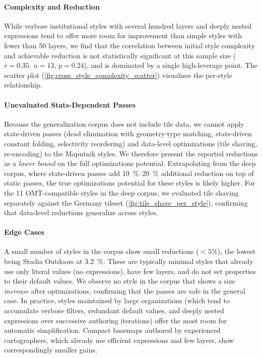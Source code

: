 \paragraph{Complexity and Reduction}
While verbose institutional styles with several hundred layers and deeply nested expressions tend to offer more room for improvement than simple styles with fewer than 50 layers, we find that the correlation between initial style complexity and achievable reduction is not statistically significant at this sample size ($r = 0.35$, $n = 13$, $p = 0.24$), and is dominated by a single high-leverage point.
The scatter plot (\cref{fig:cross_style_complexity_scatter}) visualizes the per-style relationship.

\paragraph{Unevaluated Stats-Dependent Passes}
Because the generalization corpus does not include tile data, we cannot apply stats-driven passes (dead elimination with geometry-type matching, stats-driven constant folding, selectivity reordering) and data-level optimizations (tile shaving, re-encoding) to the Maputnik styles.
We therefore present the reported reductions as a \emph{lower bound} on the full optimizations potential.
Extrapolating from the deep corpus, where stats-driven passes add \qtyrange{10}{20}{\percent} additional reduction on top of static passes, the true optimizations potential for these styles is likely higher.
For the 11 \ac{OMT}-compatible styles in the deep corpus, we evaluated tile shaving separately against the Germany tileset (\cref{fig:tile_shave_per_style}), confirming that data-level reductions generalize across styles.

\paragraph{Edge Cases}
A small number of styles in the corpus show small reductions ($< 5\%$), the lowest being Stadia Outdoors at \qty{3.2}{\percent}.
These are typically minimal styles that already use only literal values (no expressions), have few layers, and do not set properties to their default values.
We observe no style in the corpus that shows a size \emph{increase} after optimizations, confirming that the passes are safe in the general case.
In practice, styles maintained by large organizations (which tend to accumulate verbose filters, redundant default values, and deeply nested expressions over successive authoring iterations) offer the most room for automatic simplification.
Compact basemaps authored by experienced cartographers, which already use efficient expressions and few layers, show correspondingly smaller gains.


